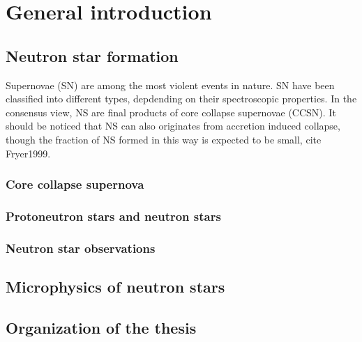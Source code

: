 \chapter*{General introduction}

% 
%

\section*{Neutron star formation}

Supernovae (SN) are among the most violent events in nature. 
%
SN have been classified into different types, depdending on their 
spectroscopic properties. 
%
In the consensus view, NS are final products of core collapse supernovae 
(CCSN).
It should be noticed that NS can also originates from accretion induced 
collapse, though the fraction of NS formed in this way is expected to be 
small, cite Fryer1999.

\subsection*{Core collapse supernova}





\subsection*{Protoneutron stars and neutron stars}



\subsection*{Neutron star observations}

\section*{Microphysics of neutron stars}

\section*{Organization of the thesis}

\clearpage\thispagestyle{empty}
